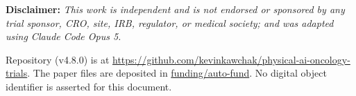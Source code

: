 \documentclass[11pt]{article}
\begin{document}
\vspace{0.12em}

\noindent\footnotesize\textbf{Disclaimer:} \textit{This work is independent and
is not endorsed or sponsored by any trial sponsor, CRO, site, IRB, regulator, or
medical society; and was adapted using Claude Code Opus 5.}\normalsize\par

\vspace{0.12em}

{\sloppy\noindent\footnotesize Repository (v4.8.0) is at
\url{https://github.com/kevinkawchak/physical-ai-oncology-trials}.
The paper files are deposited in
\href{https://github.com/kevinkawchak/physical-ai-oncology-trials/tree/main/funding/auto-fund}{funding/auto-fund}.
No digital object identifier is asserted for this document.\normalsize\par}

\renewcommand{\keywordname}{\textbf{Keywords}}

\vspace{0.25em}
\apprule{0.6pt}

\setcounter{tocdepth}{1}
\renewcommand{\contentsname}{\color{accentcol}Table of Contents}
{\setlength{\parskip}{0pt}\footnotesize\linespread{0.94}\selectfont\tableofcontents}

\vspace{-0.1em}
\apprule{0.6pt}

\clearpage

\clearpage
\clearpage
\clearpage

\clearpage


\end{document}
